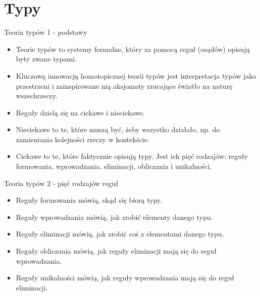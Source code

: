 \documentclass{beamer}
\begin{document}
\section{Typy}

\begin{frame}{Teoria typów 1 - podstawy}
\begin{itemize}
	\item Teorie typów to systemy formalne, który za pomocą reguł (osądów) opisują byty zwane typami.
  \item Kluczową innowacją homotopicznej teorii typów jest interpretacja typów jako przestrzeni i zainspirowane nią aksjomaty rzucające światło na naturę wszechrzeczy.
	\item Reguły dzielą się na ciekawe i nieciekawe.
	\item Nieciekawe to te, które muszą być, żeby wszystko działało, np. do zamieniania kolejności rzeczy w kontekście.
	\item Ciekawe to te, które faktycznie opisują typy. Jest ich pięć rodzajów: reguły formowania, wprowadzania, eliminacji, obliczania i unikalności.
\end{itemize}
\end{frame}

\begin{frame}{Teoria typów 2 - pięć rodzajów reguł}
\begin{itemize}
	\item Reguły formowania mówią, skąd się biorą typy.
	\item Reguły wprowadzania mówią, jak zrobić elementy danego typu.
	\item Reguły eliminacji mówią, jak zrobić coś z elementami danego typu.
	\item Reguły obliczania mówią, jak reguły eliminacji mają się do reguł wprowadzania.
	\item Reguły unikalności mówią, jak reguły wprowadzania mają się do reguł eliminacji.
\end{itemize}
\end{frame}
\end{document}
